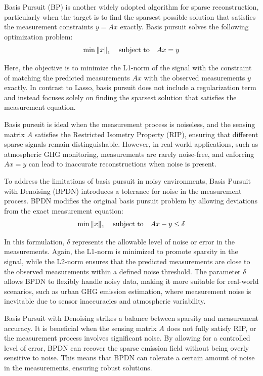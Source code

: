 Basis Pursuit (BP) is another widely adopted algorithm for sparse reconstruction, particularly when the target is to find the sparsest possible solution that satisfies the measurement constraints $y = Ax$ exactly.
Basis pursuit solves the following optimization problem:
\begin{equation}
    \min \left\lVert x\right\rVert_1 \quad \text{subject to} \quad  Ax = y
\end{equation}

Here, the objective is to minimize the L1-norm of the signal with the constraint of matching the predicted measurements $A x$ with the observed measurements $y$ exactly.
In contrast to Lasso, basis pursuit does not include a regularization term and instead focuses solely on finding the sparsest solution that satisfies the measurement equation.

Basis pursuit is ideal when the measurement process is noiseless, and the sensing matrix $A$ satisfies the Restricted Isometry Property (RIP), ensuring that different sparse signals remain distinguishable.
However, in real-world applications, such as atmospheric GHG monitoring, measurements are rarely noise-free, and enforcing $Ax = y$ can lead to inaccurate reconstructions when noise is present.

To address the limitations of basis pursuit in noisy environments, Basis Pursuit with Denoising (BPDN) introduces a tolerance for noise in the measurement process.
BPDN modifies the original basis pursuit problem by allowing deviations from the exact measurement equation:
\begin{equation}
 \min \left\lVert x\right\rVert_1 \quad \text{subject to} \quad  Ax -y \le \delta
\end{equation}

In this formulation, $\delta$ represents the allowable level of noise or error in the measurements.
Again, the L1-norm is minimized to promote sparsity in the signal, while the L2-norm ensures that the predicted measurements are close to the observed measurements within a defined noise threshold.
The parameter $\delta$ allows BPDN to flexibly handle noisy data, making it more suitable for real-world scenarios, such as urban GHG emission estimation, where measurement noise is inevitable due to sensor inaccuracies and atmospheric variability.

Basis Pursuit with Denoising strikes a balance between sparsity and measurement accuracy. It is beneficial when the sensing matrix $A$ does not fully satisfy RIP, or the measurement process involves significant noise.
By allowing for a controlled level of error, BPDN can recover the sparse emission field without being overly sensitive to noise.
This means that BPDN can tolerate a certain amount of noise in the measurements, ensuring robust solutions.

